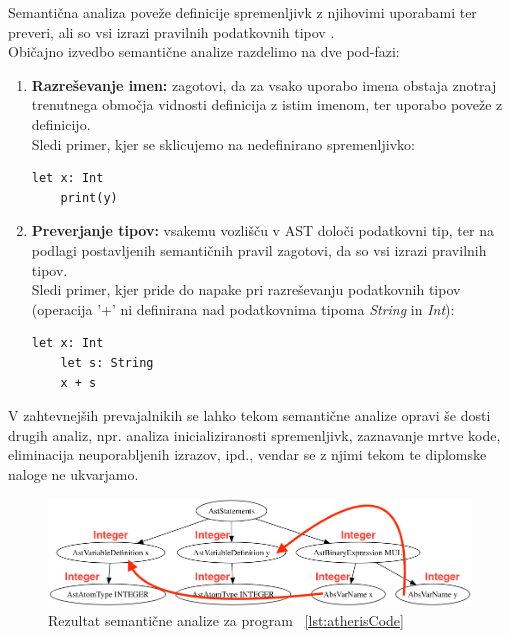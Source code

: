 \documentclass[a4paper, 12p]{book}
\begin{document}
Semantična analiza poveže definicije spremenljivk z njihovimi uporabami ter preveri, ali so vsi izrazi pravilnih podatkovnih tipov \cite{modernCompiler}. \\
\indent Običajno izvedbo semantične analize razdelimo na dve pod-fazi:
\begin{enumerate}
	\item \textbf{Razreševanje imen:} zagotovi, da za vsako uporabo imena obstaja znotraj trenutnega območja vidnosti definicija z istim imenom, ter uporabo poveže z definicijo. \\
	Sledi primer, kjer se sklicujemo na nedefinirano spremenljivko:
	
	\renewcommand{\lstlistingname}{Program}
	\begin{lstlisting}[caption={Primer programa, kjer spremenljivka \textit{y} ni definirana},label={lst:atherisCodeNameError},captionpos=b]
	let x: Int
	print(y)
	\end{lstlisting}
	
	\item \textbf{Preverjanje tipov:} vsakemu vozlišču v AST določi podatkovni tip, ter na podlagi postavljenih semantičnih pravil zagotovi, da so vsi izrazi pravilnih tipov. \\
	Sledi primer, kjer pride do napake pri razreševanju podatkovnih tipov (operacija '+' ni definirana nad podatkovnima tipoma \textit{String} in \textit{Int}):
	
	\renewcommand{\lstlistingname}{Program}
	\begin{lstlisting}[caption={Primer programa, kjer je napaka v podatkovnih tipih},label={lst:atherisCodeTypeError},captionpos=b]
	let x: Int
	let s: String
	x + s
	\end{lstlisting}
	
\end{enumerate}

V zahtevnejših prevajalnikih se lahko tekom semantične analize opravi še dosti drugih analiz, npr. analiza inicializiranosti spremenljivk, zaznavanje mrtve kode, eliminacija neuporabljenih izrazov, ipd., vendar se z njimi tekom te diplomske naloge ne ukvarjamo.

\begin{figure}[h]
	\begin{center}
		\includegraphics[width=1\textwidth]{resources/astSeman.png}
	\end{center}
	\caption{Rezultat semantične analize za program ~\ref{lst:atherisCode}}
	\label{image:astSeman}
\end{figure}
\end{document}
